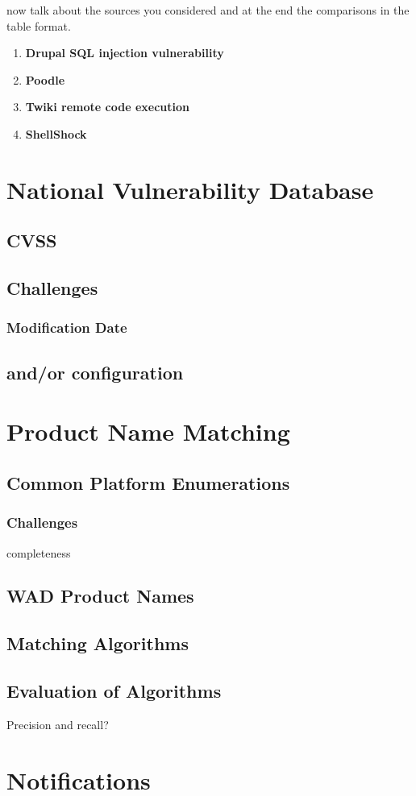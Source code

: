 now talk about the sources you considered and at the end the comparisons in the table format. 
\begin{enumerate}
\item \textbf{Drupal SQL injection vulnerability}
\item \textbf{Poodle}
\item \textbf{Twiki remote code execution}
\item \textbf{ShellShock}
\end{enumerate}

\section{National Vulnerability Database}
\subsection{CVSS}
\subsection{Challenges}
\subsubsection{Modification Date}
\subsection{and/or configuration}

\section{Product Name Matching}
\subsection{Common Platform Enumerations}
\subsubsection{Challenges}
completeness
\subsection{WAD Product Names}
\subsection{Matching Algorithms}
\subsection{Evaluation of Algorithms}
Precision and recall?
\section{Notifications}




